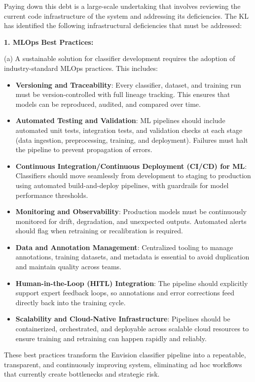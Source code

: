 \documentclass[11pt,onecolumn]{article}
\begin{document}
Paying down this debt is a large-scale undertaking that involves reviewing the current code infrastructure of the system and addressing its deficiencies. The KL has identified the following infrastructural deficiencies that must be addressed:

\textbf{1. MLOps Best Practices:}

(a) A sustainable solution for classifier development requires the adoption of industry-standard MLOps practices. This includes:

\begin{itemize}
    \item \textbf{Versioning and Traceability}: Every classifier, dataset, and training run must be version-controlled with full lineage tracking. This ensures that models can be reproduced, audited, and compared over time.
    \item \textbf{Automated Testing and Validation}: ML pipelines should include automated unit tests, integration tests, and validation checks at each stage (data ingestion, preprocessing, training, and deployment). Failures must halt the pipeline to prevent propagation of errors.
    \item \textbf{Continuous Integration/Continuous Deployment (CI/CD) for ML}: Classifiers should move seamlessly from development to staging to production using automated build-and-deploy pipelines, with guardrails for model performance thresholds.
    \item \textbf{Monitoring and Observability}: Production models must be continuously monitored for drift, degradation, and unexpected outputs. Automated alerts should flag when retraining or recalibration is required.
    \item \textbf{Data and Annotation Management}: Centralized tooling to manage annotations, training datasets, and metadata is essential to avoid duplication and maintain quality across teams.
    \item \textbf{Human-in-the-Loop (HITL) Integration}: The pipeline should explicitly support expert feedback loops, so annotations and error corrections feed directly back into the training cycle.
    \item \textbf{Scalability and Cloud-Native Infrastructure}: Pipelines should be containerized, orchestrated, and deployable across scalable cloud resources to ensure training and retraining can happen rapidly and reliably.
\end{itemize}
These best practices transform the Envision classifier pipeline into a repeatable, transparent, and continuously improving system, eliminating ad hoc workflows that currently create bottlenecks and strategic risk.
\end{document}
